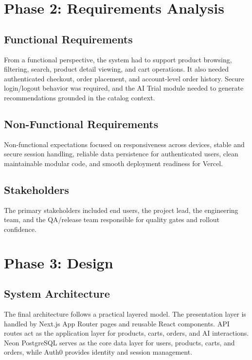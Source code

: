 \documentclass[12pt,a4paper]{article}
\begin{document}
\section{Phase 2: Requirements Analysis}
\subsection{Functional Requirements}
From a functional perspective, the system had to support product browsing, filtering, search, product detail viewing, and cart operations. It also needed authenticated checkout, order placement, and account-level order history. Secure login/logout behavior was required, and the AI Trial module needed to generate recommendations grounded in the catalog context.

\subsection{Non-Functional Requirements}
Non-functional expectations focused on responsiveness across devices, stable and secure session handling, reliable data persistence for authenticated users, clean maintainable modular code, and smooth deployment readiness for Vercel.

\subsection{Stakeholders}
The primary stakeholders included end users, the project lead, the engineering team, and the QA/release team responsible for quality gates and rollout confidence.

\section{Phase 3: Design}
\subsection{System Architecture}
The final architecture follows a practical layered model. The presentation layer is handled by Next.js App Router pages and reusable React components. API routes act as the application layer for products, carts, orders, and AI interactions. Neon PostgreSQL serves as the core data layer for users, products, carts, and orders, while Auth0 provides identity and session management.
\end{document}
